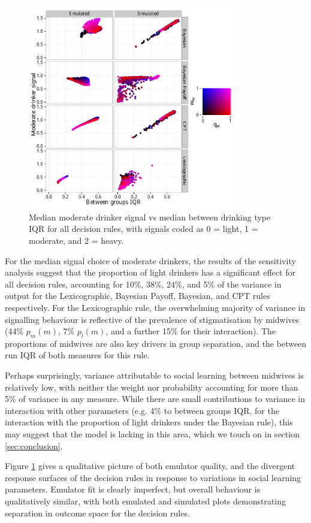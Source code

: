 \documentclass[graybox]{svmult}
\begin{document}
\begin{figure}[H]
\includegraphics[width=90mm]{figures/sharing_emulated_simulated}
\caption{Median moderate drinker signal vs median between drinking type IQR for all decision rules, with signals coded as 0 = light, 1 = moderate, and 2 = heavy.}
\label{fig:outcome_plots}
\end{figure}

For the median signal choice of moderate drinkers, the results of the sensitivity analysis suggest that the proportion of light drinkers has a significant effect for all decision rules, accounting for 10\%, 38\%, 24\%, and 5\% of the variance in output for the Lexicographic, Bayesian Payoff, Bayesian, and \ac{CPT} rules respectively. For the Lexicographic rule, the overwhelming majority of variance in signalling behaviour is reflective of the prevalence of stigmatisation by midwives (44\% \(p_{m}(m)\), 7\% \(p_{l}(m)\), and a further 15\% for their interaction).  The proportions of midwives are also key drivers in group separation, and the between run IQR of both measures for this rule. 

Perhaps surprisingly, variance attributable to social learning between midwives is relatively low, with neither the weight nor probability accounting for more than 5\% of variance in any measure. While there are small contributions to variance in interaction with other parameters (e.g. 4\% to between groups IQR, for the interaction with the proportion of light drinkers under the Bayesian rule), this may suggest that the model is lacking in this area, which we touch on in section \ref{sec:conclusion}.

Figure \ref{fig:outcome_plots} gives a qualitative picture of both emulator quality, and the divergent response surfaces of the decision rules in response to variations in social learning parameters. Emulator fit is clearly imperfect, but overall behaviour is qualitatively similar, with both emulated and simulated plots demonstrating separation in outcome space for the decision rules.
\end{document}
